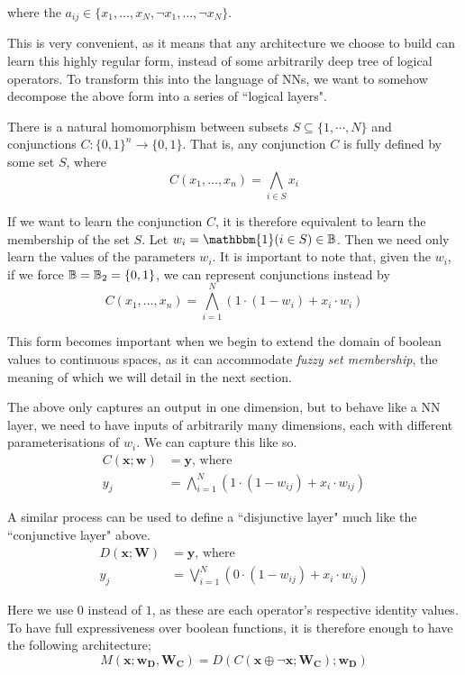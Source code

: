 \documentclass[conference]{report}
\begin{document}
where the $a_{ij} \in \{x_1, \dots, x_N, \lnot x_1, \dots, \lnot x_N\}$.

This is very convenient, as it means that any architecture we choose to build can learn this highly regular form, instead of some arbitrarily deep tree of logical operators. To transform this into the language of NNs, we want to somehow decompose the above form into a series of ``logical layers". 

There is a natural homomorphism between subsets $S \subseteq \{1, \cdots, N\}$ and conjunctions $C : \{0,1\}^n \to \{0,1\}$. That is, any conjunction $C$ is fully defined by some set $S$, where
$$C(x_1, \dots, x_n) = \bigwedge_{i\in S} x_i$$

If we want to learn the conjunction $C$, it is therefore equivalent to learn the membership of the set $S$. Let $w_i = \mathbbm{1}(i \in S) \in \B$. Then we need only learn the values of the parameters $w_i$. It is important to note that, given the $w_i$, if we force $\mathbb{B} = \mathbb{B}_2 = \{0,1\}$, we can represent conjunctions instead by
$$C(x_1, \dots, x_n) = \bigwedge_{i=1}^N (1 \cdot (1 - w_i) + x_i \cdot w_i)$$

This form becomes important when we begin to extend the domain of boolean values to continuous spaces, as it can accommodate \textit{fuzzy set membership}, the meaning of which we will detail in the next section.

The above only captures an output in one dimension, but to behave like a NN layer, we need to have inputs of arbitrarily many dimensions, each with different parameterisations of $w_i$. We can capture this like so.
$$
\begin{aligned}
C(\mathbf{x};\mathbf{w}) &= \mathbf{y} \text{, where} \\
y_j &= \bigwedge_{i=1}^N(1 \cdot (1-w_{ij}) + x_i \cdot w_{ij})
\end{aligned}
$$

A similar process can be used to define a ``disjunctive layer" much like the ``conjunctive layer" above.
$$
\begin{aligned}
D(\mathbf{x};\mathbf{W}) &= \mathbf{y} \text{, where} \\
y_j &= \bigvee_{i=1}^N(0 \cdot (1-w_{ij}) + x_i \cdot w_{ij})
\end{aligned}
$$

Here we use $0$ instead of $1$, as these are each operator's respective identity values. To have full expressiveness over boolean functions, it is therefore enough to have the following architecture;
$$M(\mathbf{x;w_D,W_C})=D(C(\mathbf{x \oplus \lnot x;W_C});\mathbf{w_D})$$
\end{document}
